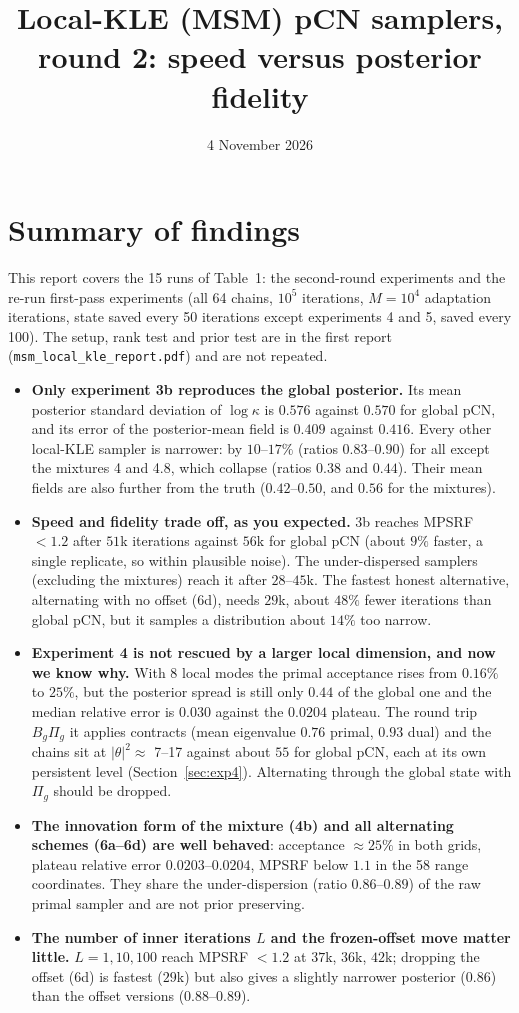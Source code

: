 \documentclass[11pt]{article}
\title{Local-KLE (MSM) pCN samplers, round 2: speed versus posterior fidelity}
\date{4 November 2026}
\begin{document}
\maketitle

\section{Summary of findings}
This report covers the 15 runs of Table~1: the second-round experiments and the re-run first-pass experiments (all 64 chains, $10^5$ iterations, $M=10^4$ adaptation iterations, state saved every 50 iterations except experiments 4 and 5, saved every 100). The setup, rank test and prior test are in the first report (\texttt{msm\_local\_kle\_report.pdf}) and are not repeated.
\begin{itemize}
\item \textbf{Only experiment 3b reproduces the global posterior.} Its mean posterior standard deviation of $\log\kappa$ is $0.576$ against $0.570$ for global pCN, and its error of the posterior-mean field is $0.409$ against $0.416$. Every other local-KLE sampler is narrower: by $10$--$17\%$ (ratios $0.83$--$0.90$) for all except the mixtures 4 and 4.8, which collapse (ratios $0.38$ and $0.44$). Their mean fields are also further from the truth ($0.42$--$0.50$, and $0.56$ for the mixtures).
\item \textbf{Speed and fidelity trade off, as you expected.} 3b reaches MPSRF $<1.2$ after $51$k iterations against $56$k for global pCN (about $9\%$ faster, a single replicate, so within plausible noise). The under-dispersed samplers (excluding the mixtures) reach it after $28$--$45$k. The fastest honest alternative, alternating with no offset (6d), needs $29$k, about $48\%$ fewer iterations than global pCN, but it samples a distribution about $14\%$ too narrow.
\item \textbf{Experiment 4 is not rescued by a larger local dimension, and now we know why.} With 8 local modes the primal acceptance rises from $0.16\%$ to $25\%$, but the posterior spread is still only $0.44$ of the global one and the median relative error is $0.030$ against the $0.0204$ plateau. The round trip $B_g\Pi_g$ it applies contracts (mean eigenvalue $0.76$ primal, $0.93$ dual) and the chains sit at $|\theta|^2\approx$ 7--17 against about $55$ for global pCN, each at its own persistent level (Section~\ref{sec:exp4}). Alternating through the global state with $\Pi_g$ should be dropped.
\item \textbf{The innovation form of the mixture (4b) and all alternating schemes (6a--6d) are well behaved}: acceptance $\approx25\%$ in both grids, plateau relative error $0.0203$--$0.0204$, MPSRF below $1.1$ in the 58 range coordinates. They share the under-dispersion (ratio $0.86$--$0.89$) of the raw primal sampler and are not prior preserving.
\item \textbf{The number of inner iterations $L$ and the frozen-offset move matter little.} $L=1,10,100$ reach MPSRF $<1.2$ at $37$k, $36$k, $42$k; dropping the offset (6d) is fastest ($29$k) but also gives a slightly narrower posterior ($0.86$) than the offset versions ($0.88$--$0.89$).
\end{itemize}
\end{document}
